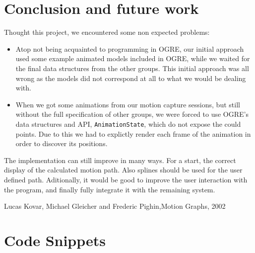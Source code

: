 \documentclass[a4paper]{article}
\begin{document}
\section{Conclusion and future work}

Thought this project, we encountered some non expected problems:
\begin{itemize}
	\item Atop not being acquainted to programming in OGRE, our initial approach used some example animated models included in OGRE, while we waited for the final data structures from the other groups. This initial approach was all wrong as the models did not correspond at all to what we would be dealing with.
	\item When we got some animations from our motion capture sessions, but still without the full specification of other groups, we were forced to use OGRE's data structures and API, \texttt{AnimationState}, which do not expose the could points. Due to this we had to explictly render each frame of the animation in order to discover its positions.
\end{itemize}


The implementation can still improve in many ways. For a start, the correct display of the calculated motion path. Also splines should be used for the user defined path. Aditionally, it would be good to improve the user interaction with the program, and finally fully integrate it with the remaining system.





\begin{thebibliography}{}

{Lucas Kovar, Michael Gleicher and Frederic Pighin},{Motion Graphs}, {2002}
    
    
\end{thebibliography} 



\appendix
\section{Code Snippets}
\begin{framed}

\end{framed}
\end{document}
